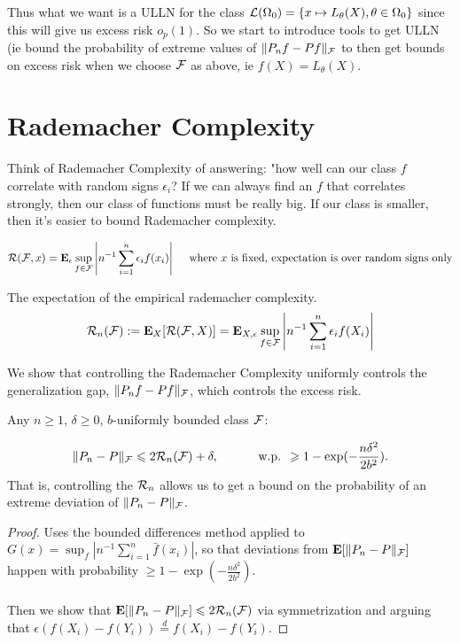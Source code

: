 \documentclass{article}
\begin{document}
Thus what we want is a ULLN for the class $\mathcal L(\Omega_0) = \{x\mapsto L_\theta(X), \theta\in \Omega_0\}$ since this will give us excess risk $o_p(1)$. So we start to introduce tools to get ULLN (ie bound the probability of extreme values of $\|P_n f - Pf\|_\mathcal F$ to then get bounds on excess risk when we choose $\mathcal F$ as above, ie $f(X) = L_\theta(X)$. 

\section{Rademacher Complexity}
Think of Rademacher Complexity of answering: "how well can our class $f$ correlate with random signs $\epsilon_i$? If we can always find an $f$ that correlates strongly, then our class of functions must be really big. If our class is smaller, then it's easier to bound Rademacher complexity. 

\begin{definition}
$$\mathcal R(\mathcal F, x) = \mathbf{E}_\epsilon \sup_{f\in\mathcal F} \left| n^{-1} \sum_{i=1}^n \epsilon_i f(x_i)\right| \quad \text{ where $x$ is fixed, expectation is over random signs only} $$
\end{definition}
\begin{definition}
The expectation of the empirical rademacher complexity.
$$\mathcal R_n(\mathcal F):=\mathbf{E}_X [\mathcal R(\mathcal F, X)] = \mathbf{E}_{X,\epsilon} \sup_{f\in\mathcal F} \left| n^{-1} \sum_{i=1}^n \epsilon_i f(X_i)\right| $$
\end{definition}

We show that controlling the Rademacher Complexity uniformly controls the generalization gap, $\|P_n f - Pf\|_\mathcal F$, which controls the excess risk. 

\begin{theorem}
Any $n\geq 1$, $\delta\geq 0$, $b$-uniformly bounded class $\mathcal F$:

$$\|P_n - P\|_\mathcal F \leqslant 2\mathcal R_n(\mathcal F) + \delta, \hspace{1cm} \text{ w.p. } \geqslant 1-\exp(-\frac{n\delta^2}{2b^2}).$$
That is, controlling the $\mathcal R_n$ allows us to get a bound on the probability of an extreme deviation of $\|P_n -P\|_\mathcal F$. 
\begin{proof}
	Uses the bounded differences method applied to $G(x) = \sup_f \left|n^{-1} \sum_{i=1}^n \bar f(x_i)\right|$, so that deviations from $\mathbf{E}[\|P_n - P\|_\mathcal F]$ happen with probability $\geq 1-\exp(-\frac{n\delta^2}{2b^2})$. \\\\Then we show that $\mathbf{E}[\|P_n - P\|_\mathcal F] \leqslant 2\mathcal R_n(\mathcal F)$ via symmetrization and arguing that $\epsilon (f(X_i) - f(Y_i)) \overset{d}{=} f(X_i) - f(Y_i)$. 
\end{proof}
\end{theorem}
\end{document}
